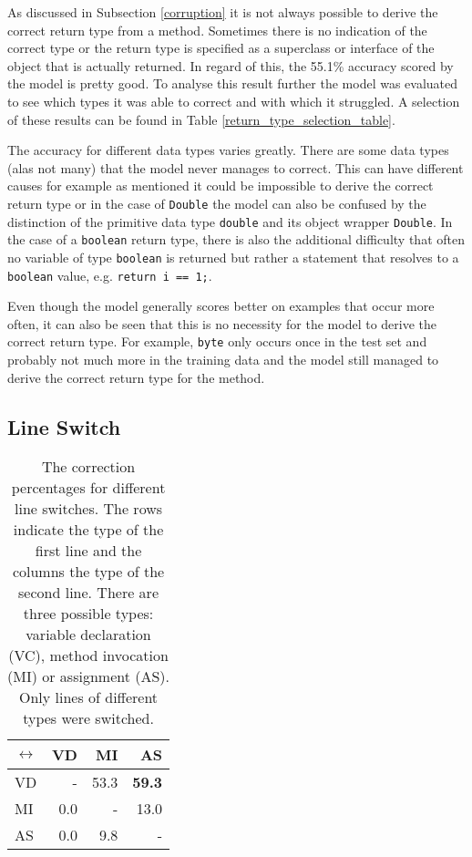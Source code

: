 As discussed in Subsection \ref{corruption} it is not always possible to derive the correct return type from a method. Sometimes there is no indication of the correct type or the return type is specified as a superclass or interface of the object that is actually returned. In regard of this, the 55.1\% accuracy scored by the model is pretty good. To analyse this result further the model was evaluated to see which types it was able to correct and with which it struggled. A selection of these results can be found in Table \ref{return_type_selection_table}.

The accuracy for different data types varies greatly. There are some data types (alas not many) that the model never manages to correct. This can have different causes for example as mentioned it could be impossible to derive the correct return type or in the case of \texttt{Double} the model can also be confused by the distinction of the primitive data type \texttt{double} and its object wrapper \texttt{Double}. In the case of a \texttt{boolean} return type, there is also the additional difficulty that often no variable of type \texttt{boolean} is returned but rather a statement that resolves to a \texttt{boolean} value, e.g. \texttt{return i == 1;}.

Even though the model generally scores better on examples that occur more often, it can also be seen that this is no necessity for the model to derive the correct return type. For example, \texttt{byte} only occurs once in the test set and probably not much more in the training data and the model still managed to derive the correct return type for the method.

\subsection{Line Switch}
\label{switch_analysis}

\begin{table}[t]
\centering
\begin{tabular}{ | l | r | r | r | }
  \hline
  \(\leftrightarrow\) & VD & MI & AS \\
  \hline
  \hline
  VD & - & 53.3 & \textbf{59.3} \\
  \hline
  MI & 0.0 & - & 13.0 \\
  \hline
  AS & 0.0 & 9.8 & - \\
  \hline
\end{tabular}
\caption{The correction percentages for different line switches. The rows indicate the type of the first line and the columns the type of the second line. There are three possible types: variable declaration (VC), method invocation (MI) or assignment (AS). Only lines of different types were switched.}
\label{switch_table}
\end{table}

